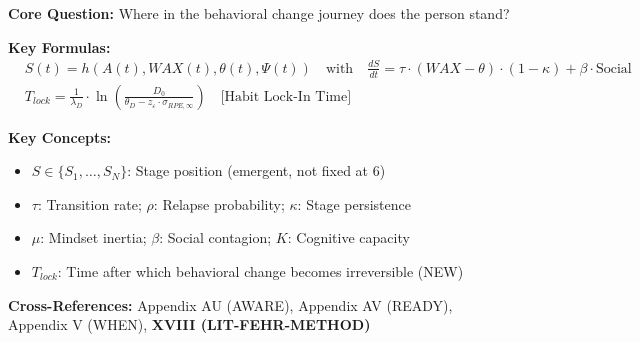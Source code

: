 \begin{tcolorbox}[colback=blue!5!white, colframe=blue!75!black,
    title=Quick Reference: CORE-STAGE]

\textbf{Core Question:} Where in the behavioral change journey does the person stand?

\textbf{Key Formulas:}
\begin{align}
&\boxed{S(t) = h(A(t), WAX(t), \theta(t), \Psi(t)) \quad \text{with} \quad \frac{dS}{dt} = \tau \cdot (WAX - \theta) \cdot (1-\kappa) + \beta \cdot \text{Social}} \\[3pt]
&\boxed{T_{lock} = \frac{1}{\lambda_D} \cdot \ln\left(\frac{D_0}{\theta_D - z_\varepsilon \cdot \sigma_{RPE,\infty}}\right) \quad \text{[Habit Lock-In Time]}}
\end{align}

\textbf{Key Concepts:}
\begin{itemize}[nosep]
\item $S \in \{S_1, \ldots, S_N\}$: Stage position (emergent, not fixed at 6)
\item $\tau$: Transition rate; $\rho$: Relapse probability; $\kappa$: Stage persistence
\item $\mu$: Mindset inertia; $\beta$: Social contagion; $K$: Cognitive capacity
\item $T_{lock}$: Time after which behavioral change becomes irreversible (NEW)
\end{itemize}

\textbf{Cross-References:} Appendix AU (AWARE), Appendix AV (READY), Appendix V (WHEN), \textbf{XVIII (LIT-FEHR-METHOD)}
\end{tcolorbox}

